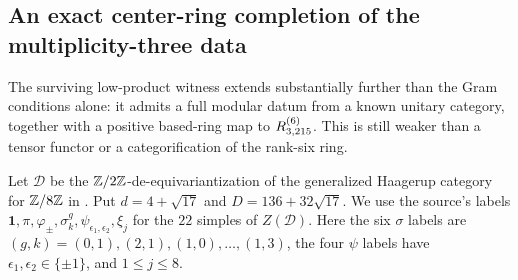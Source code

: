 \subsection{An exact center-ring completion of the multiplicity-three data}
\label{sec:cyclic-eight-center}
The surviving low-product witness extends substantially further than the
Gram conditions alone: it admits a full modular datum from a known unitary
category, together with a positive based-ring map to $R^{(6)}_{3,215}$.
This is still weaker than a tensor functor or a categorification of the
rank-six ring.

Let $\mathcal D$ be the $\mathbb Z/2\mathbb Z$-de-equivariantization of the generalized
Haagerup category for $\mathbb Z/8\mathbb Z$ in
\cite[Theorem~6.8 and Example~6.10]{GIcenters}. Put $d=4+\sqrt{17}$ and
$D=136+32\sqrt{17}$. We use the source's labels
$\mathbf1,\pi,\varphi_\pm,\sigma^g_k,\psi_{\epsilon_1,\epsilon_2},\xi_j$
for the $22$ simples of $Z(\mathcal D)$.
Here the six $\sigma$ labels are $(g,k)=(0,1),(2,1),(1,0),\ldots,(1,3)$,
the four $\psi$ labels have $\epsilon_1,\epsilon_2\in\{\pm1\}$, and
$1\le j\le8$.

